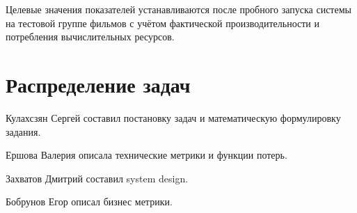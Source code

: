 \documentclass[a4paper,14pt]{extarticle}
\begin{document}
    Целевые значения показателей устанавливаются после пробного запуска системы на тестовой группе фильмов с учётом фактической производительности и потребления вычислительных ресурсов.

    \section{Распределение задач}
    Кулахсзян Сергей составил постановку задач и математическую формулировку задания.

    Ершова Валерия описала технические метрики и функции потерь.

    Захватов Дмитрий составил system design.

    Бобрунов Егор описал бизнес метрики.
\end{document}
